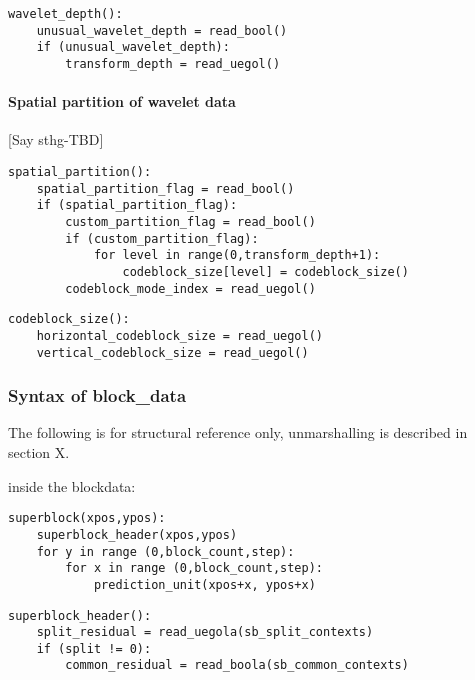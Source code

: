 {\begin{verbatim}
wavelet_depth():
    unusual_wavelet_depth = read_bool()
    if (unusual_wavelet_depth):
        transform_depth = read_uegol()
\end{verbatim}

\paragraph{Spatial partition of wavelet data\newline}
\label{spatialpartition}

[Say sthg-TBD]

\begin{verbatim}
spatial_partition():
    spatial_partition_flag = read_bool()
    if (spatial_partition_flag):
        custom_partition_flag = read_bool()
        if (custom_partition_flag):
            for level in range(0,transform_depth+1):
                codeblock_size[level] = codeblock_size()
        codeblock_mode_index = read_uegol()
\end{verbatim}

\begin{verbatim}
codeblock_size():
    horizontal_codeblock_size = read_uegol()
    vertical_codeblock_size = read_uegol()
\end{verbatim}


\subsubsection{Syntax of block\_data}

The following is for structural reference only, unmarshalling is
described in section X.

inside the blockdata:

\begin{verbatim}
superblock(xpos,ypos):
    superblock_header(xpos,ypos)
    for y in range (0,block_count,step):
        for x in range (0,block_count,step):
            prediction_unit(xpos+x, ypos+x)
\end{verbatim}

\begin{verbatim}
superblock_header():
    split_residual = read_uegola(sb_split_contexts)
    if (split != 0):
        common_residual = read_boola(sb_common_contexts)
\end{verbatim}

}
